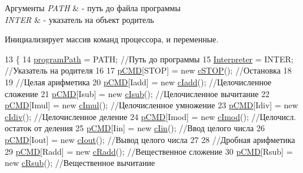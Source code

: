 \begin{DoxyParams}{Аргументы}
{\em P\+A\+TH} & -\/ путь до файла программы \\
\hline
{\em I\+N\+T\+ER} & -\/ указатель на объект родитель\\
\hline
\end{DoxyParams}
Инициализирует массив команд процессора, и переменные. 
\begin{DoxyCode}
13 \{
14     \hyperlink{class_computer_a05fb0474bddcf52789780fd6457cefac}{programPath} = PATH;     \textcolor{comment}{//Путь до программы}
15     \hyperlink{class_computer_aa58d6e565412d6705657c0418b1e59fe}{Interpreter} = INTER;    \textcolor{comment}{//Указатель на родителя}
16 
17     \hyperlink{class_computer_a297a9b79381a9f2005c574f09ea73d70}{pCMD}[STOP]  =   \textcolor{keyword}{new} \hyperlink{classc_s_t_o_p}{cSTOP}();    \textcolor{comment}{//Остановка}
18 
19     \textcolor{comment}{//Целая арифметика}
20     \hyperlink{class_computer_a297a9b79381a9f2005c574f09ea73d70}{pCMD}[Iadd]  =   \textcolor{keyword}{new} \hyperlink{classc_iadd}{cIadd}();    \textcolor{comment}{//Целочисленное сложение}
21     \hyperlink{class_computer_a297a9b79381a9f2005c574f09ea73d70}{pCMD}[Isub]  =   \textcolor{keyword}{new} \hyperlink{classc_isub}{cIsub}();    \textcolor{comment}{//Целочисленное вычитание}
22     \hyperlink{class_computer_a297a9b79381a9f2005c574f09ea73d70}{pCMD}[Imul]  =   \textcolor{keyword}{new} \hyperlink{classc_imul}{cImul}();    \textcolor{comment}{//Целочисленное умножение}
23     \hyperlink{class_computer_a297a9b79381a9f2005c574f09ea73d70}{pCMD}[Idiv]  =   \textcolor{keyword}{new} \hyperlink{classc_idiv}{cIdiv}();    \textcolor{comment}{//Целочисленное деление}
24     \hyperlink{class_computer_a297a9b79381a9f2005c574f09ea73d70}{pCMD}[Imod]  =   \textcolor{keyword}{new} \hyperlink{classc_imod}{cImod}();    \textcolor{comment}{//Целочисл. остаток от деления}
25     \hyperlink{class_computer_a297a9b79381a9f2005c574f09ea73d70}{pCMD}[Iin]   =   \textcolor{keyword}{new} \hyperlink{classc_iin}{cIin}();     \textcolor{comment}{//Ввод целого числа}
26     \hyperlink{class_computer_a297a9b79381a9f2005c574f09ea73d70}{pCMD}[Iout]  =   \textcolor{keyword}{new} \hyperlink{classc_iout}{cIout}();    \textcolor{comment}{//Вывод целого числа}
27 
28     \textcolor{comment}{//Дробная арифметика}
29     \hyperlink{class_computer_a297a9b79381a9f2005c574f09ea73d70}{pCMD}[Radd]  =   \textcolor{keyword}{new} \hyperlink{classc_radd}{cRadd}();    \textcolor{comment}{//Вещественное сложение}
30     \hyperlink{class_computer_a297a9b79381a9f2005c574f09ea73d70}{pCMD}[Rsub]  =   \textcolor{keyword}{new} \hyperlink{classc_rsub}{cRsub}();    \textcolor{comment}{//Вещественное вычитание}

\end{DoxyCode}

